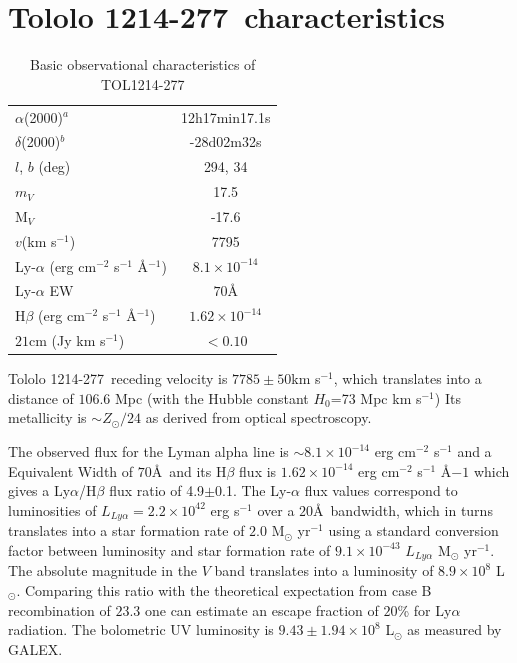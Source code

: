 \documentclass[a4paper, usenatbib, 12pt]{article}
\newcommand{\tol}{Tololo 1214-277}
\begin{document}
{\newpage 

\section*{\tol\ characteristics}


\begin{table}
\begin{center}
\begin{tabular}{lc}
$\alpha$(2000)$^{a}$ & 12h17min17.1s\\
$\delta$(2000)$^{b}$ & -28d02m32s\\
$l$, $b$ (deg) & 294, 34\\
$m_V$ & 17.5\\
  M$_V$ & -17.6\\ 
$v$(km s$^{-1}$) & 7795\\
Ly-$\alpha$ (erg cm$^{-2}$ s$^{-1}$ \AA$^{-1}$)& $8.1\times 10^{-14}$ \\
Ly-$\alpha$ EW & $70$\AA\\
H$\beta$ (erg cm$^{-2}$ s$^{-1}$ \AA$^{-1}$) & $1.62\times 10^{-14}$ \\
$21$cm (Jy km s$^{-1}$)& $<0.10$ \\
\end{tabular}
\end{center}
\caption{Basic observational characteristics of TOL1214-277
  \cite{Thuan97}\\} 
\end{table}


\tol\ receding velocity is $7785\pm 50$km s$^{-1}$, which translates
into a distance of $106.6$ Mpc (with the Hubble constant $H_{0}$=73
Mpc km s$^{-1}$) 
Its metallicity is $\sim Z_{\odot}/24$ \cite{Izotov04} as derived from optical
spectroscopy. 


The observed flux for the Lyman alpha line is $\sim
8.1\times 10^{-14}$ erg cm$^{-2}$ s$^{-1}$ \cite{Thuan97}
and a Equivalent Width of $70$\AA\ and its H$\beta$ flux is 
$1.62\times 10^{-14}$ erg cm$^{-2}$ s$^{-1}$ \AA${-1}$
\cite{Izotov04} which gives a Ly$\alpha$/H$\beta$ flux ratio of
4.9$\pm$0.1. The Ly-$\alpha$ flux values correspond to luminosities of
$L_{Ly\alpha}=2.2\times 10^{42}$ erg s$^{-1}$ over a $20$\AA\ 
bandwidth, which in turns translates  into a star formation rate of
$2.0$ M$_{\odot}$ yr$^{-1}$ using a standard conversion factor between
luminosity and star formation rate of $9.1\times 10^{-43}$
$L_{Ly\alpha}$ M$_{\odot}$ yr$^{-1}$. 
The absolute magnitude in the $V$ band translates into a luminosity of
$8.9\times 10^{8}$ L$_{\odot}$.
Comparing this ratio with the theoretical expectation from case B
recombination of $23.3$ \cite{Hummer1987} one can estimate an escape
fraction of $20$\% for Ly$\alpha$ radiation.
The bolometric UV luminosity is $9.43\pm1.94 \times 10^{8}$
L$_{\odot}$ as measured by GALEX. 


}
\end{document}

